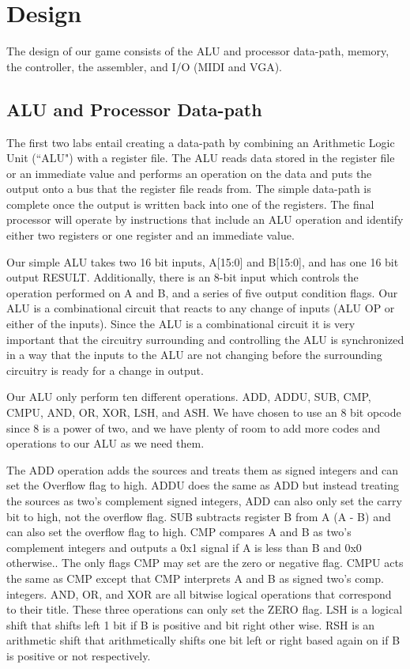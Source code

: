 \documentclass[onecolumn, 12pt]{IEEEtran}
\begin{document}
\section{Design}
The design of our game consists of the ALU and processor data-path, memory, the controller, the assembler, and I/O (MIDI and VGA).
\subsection{ALU and Processor Data-path}
The first two labs entail creating a data-path by combining an Arithmetic Logic Unit (``ALU") with a register file.  The ALU reads data stored in the register file or an immediate value and performs an operation on the data and puts the output onto a bus that the register file reads from.  The simple data-path is complete once the output is written back into one of the registers.  The final processor will operate by instructions that include an ALU operation and identify either two registers or one register and an immediate value.
\par
Our simple ALU takes two 16 bit inputs, A[15:0] and B[15:0], and has one 16 bit output  RESULT.  Additionally, there is an 8-bit input which controls the operation performed on A and B, and a series of five output condition flags. Our ALU is a combinational circuit that reacts to any change of inputs (ALU OP or either of the inputs). Since the ALU is a combinational circuit it is very important that the circuitry surrounding and controlling the ALU is synchronized in a way that the inputs to the ALU are not changing before the surrounding circuitry is ready for a change in output.
\par
Our ALU only perform ten different operations. ADD, ADDU, SUB, CMP, CMPU, AND, OR, XOR, LSH, and ASH. We have chosen to use an 8 bit opcode since 8 is a power of two, and we have plenty of room to add more codes and operations to our ALU as we need them.
\par
The ADD operation adds the sources and treats them as signed integers and can set the Overflow flag to high. ADDU does the same as ADD but instead  treating the sources as two's complement signed integers, ADD  can also only set the carry bit to high, not the overflow flag. SUB subtracts register B from A (A - B) and can also set the overflow flag to high. CMP compares A and B as two's complement integers and outputs a 0x1 signal if  A is less than B and 0x0 otherwise.. The only flags CMP may set are the zero or negative flag. CMPU acts the same as CMP except that CMP interprets A and B as signed two's comp. integers. AND, OR, and XOR are all bitwise logical operations that correspond to their title. These three operations can only set the ZERO flag. LSH is a logical shift that shifts left 1 bit if B is positive and bit right other wise. RSH is an arithmetic shift that arithmetically shifts one bit left or right based again on if B is positive or not respectively.
\end{document}

